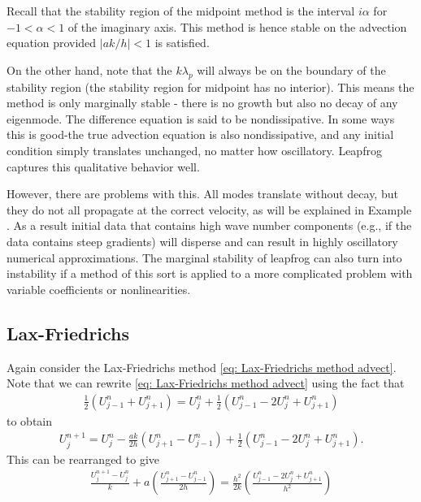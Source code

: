 Recall that the stability region of the midpoint method is the interval $i \alpha$ for $-1<\alpha<1$ of the imaginary axis. This method is hence stable on the advection equation provided $|a k / h|<1$ is satisfied.

On the other hand, note that the $k \lambda_p$ will always be on the boundary of the stability region (the stability region for midpoint has no interior). This means the method is only marginally stable - there is no growth but also no decay of any eigenmode. The difference equation is said to be nondissipative. In some ways this is good-the true advection equation is also nondissipative, and any initial condition simply translates unchanged, no matter how oscillatory. Leapfrog captures this qualitative behavior well.

However, there are problems with this. All modes translate without decay, but they do not all propagate at the correct velocity, as will be explained in Example \wc. As a result initial data that contains high wave number components (e.g., if the data contains steep gradients) will disperse and can result in highly oscillatory numerical approximations.
The marginal stability of leapfrog can also turn into instability if a method of this sort is applied to a more complicated problem with variable coefficients or nonlinearities.

\subsection{Lax-Friedrichs}
Again consider the Lax-Friedrichs method \eqref{eq: Lax-Friedrichs method advect}. Note that we can rewrite \eqref{eq: Lax-Friedrichs method advect} using the fact that
\begin{align*}
\frac{1}{2}\left(U_{j-1}^n+U_{j+1}^n\right)=U_j^n+\frac{1}{2}\left(U_{j-1}^n-2 U_j^n+U_{j+1}^n\right)
\end{align*}
to obtain
\begin{align}
    \label{eq: LF method avect diff}
U_j^{n+1}=U_j^n-\frac{a k}{2 h}\left(U_{j+1}^n-U_{j-1}^n\right)+\frac{1}{2}\left(U_{j-1}^n-2 U_j^n+U_{j+1}^n\right) .
\end{align}
This can be rearranged to give
\begin{align*}
\frac{U_j^{n+1}-U_j^n}{k}+a\left(\frac{U_{j+1}^n-U_{j-1}^n}{2 h}\right)=\frac{h^2}{2 k}\left(\frac{U_{j-1}^n-2 U_j^n+U_{j+1}^n}{h^2}\right)
\end{align*}


